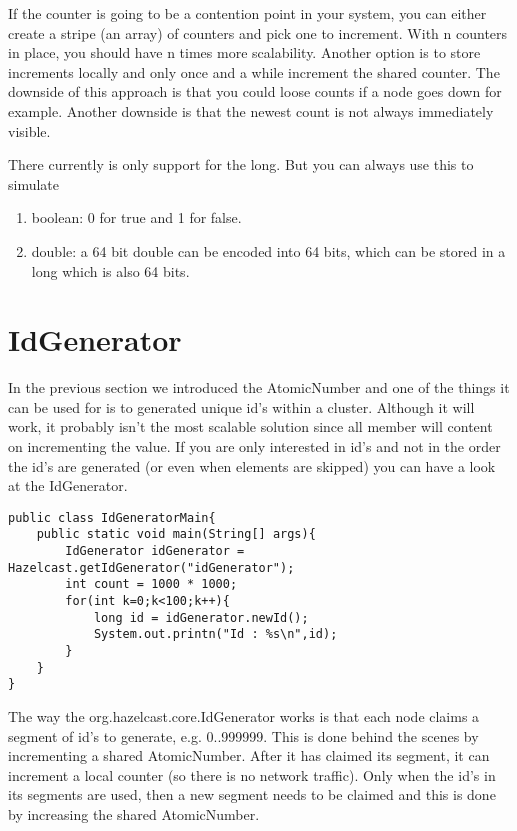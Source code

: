 If the counter is going to be a contention point in your system, you can either create
a stripe (an array) of counters and pick one to increment. With n counters in place, you 
should have n times more scalability. Another option is to store increments locally and 
only once and a while increment the shared counter. The downside of this approach is that
you could loose counts if a node goes down for example. Another downside is that the newest
count is not always immediately visible. 

There currently is only support for the long. But you can always use this to simulate
\begin{enumerate}
\item boolean: 0 for true and 1 for false.
\item double: a 64 bit double can be encoded into 64 bits, which can be stored in a long 
      which is also 64 bits.
\end{enumerate}

\section{IdGenerator}

In the previous section we introduced the AtomicNumber and one of the things it
can be used for is to generated unique id's within a cluster. Although it will work,
it probably isn't the most scalable solution since all member will content on incrementing
the value. If you are only interested in id's and not in the order the id's are generated 
(or even when elements are skipped) you can have a look at the IdGenerator.

\begin{verbatim}
public class IdGeneratorMain{
    public static void main(String[] args){
        IdGenerator idGenerator = Hazelcast.getIdGenerator("idGenerator");
        int count = 1000 * 1000;
        for(int k=0;k<100;k++){
            long id = idGenerator.newId();
            System.out.printn("Id : %s\n",id);
        }
    }
}
\end{verbatim}

The way the org.hazelcast.core.IdGenerator works is that each node claims a segment of 
id's to generate, e.g. 0..999999. This is done behind the scenes by incrementing a shared 
AtomicNumber. After it has claimed its segment, it can increment a local counter (so there is 
no network traffic). Only when the id's in its segments are used, then a new segment
needs to be claimed and this is done by increasing the shared AtomicNumber.

